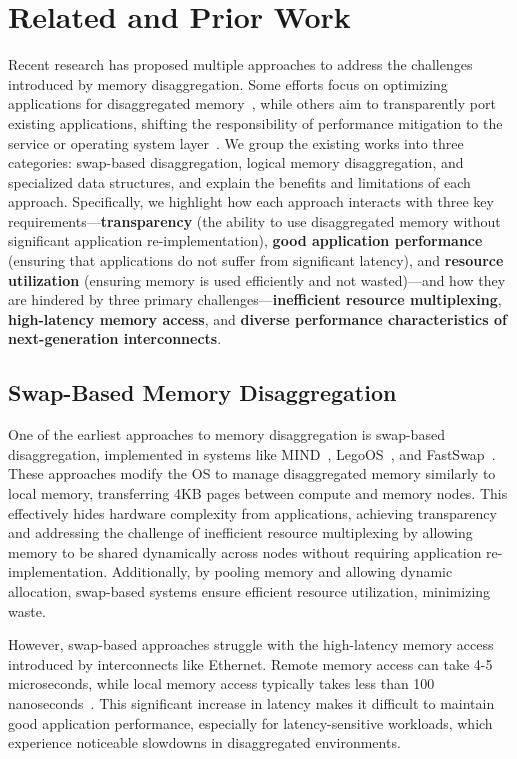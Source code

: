 \chapter{Related and Prior Work}

Recent research has proposed multiple approaches to address the challenges introduced by memory disaggregation. Some efforts focus on optimizing applications for disaggregated memory~\cite{farm, aifm, sherman, existing1}, while others aim to transparently port existing applications, shifting the responsibility of performance mitigation to the service or operating system layer~\cite{mind, legoos, fastswap, infiniswap, runtime1, runtime2}. We group the existing works into three categories: swap-based disaggregation, logical memory disaggregation, and specialized data structures, and explain the benefits and limitations of each approach. Specifically, we highlight how each approach interacts with three key requirements—\textbf{transparency} (the ability to use disaggregated memory without significant application re-implementation), \textbf{good application performance} (ensuring that applications do not suffer from significant latency), and \textbf{resource utilization} (ensuring memory is used efficiently and not wasted)—and how they are hindered by three primary challenges—\textbf{inefficient resource multiplexing}, \textbf{high-latency memory access}, and \textbf{diverse performance characteristics of next-generation interconnects}.

\section{Swap-Based Memory Disaggregation}

One of the earliest approaches to memory disaggregation is swap-based disaggregation, implemented in systems like MIND~\cite{mind}, LegoOS~\cite{legoos}, and FastSwap~\cite{fastswap}. These approaches modify the OS to manage disaggregated memory similarly to local memory, transferring 4KB pages between compute and memory nodes. This effectively hides hardware complexity from applications, achieving transparency and addressing the challenge of inefficient resource multiplexing by allowing memory to be shared dynamically across nodes without requiring application re-implementation. Additionally, by pooling memory and allowing dynamic allocation, swap-based systems ensure efficient resource utilization, minimizing waste.

However, swap-based approaches struggle with the high-latency memory access introduced by interconnects like Ethernet. Remote memory access can take 4-5 microseconds, while local memory access typically takes less than 100 nanoseconds~\cite{cxl1, mind}. This significant increase in latency makes it difficult to maintain good application performance, especially for latency-sensitive workloads, which experience noticeable slowdowns in disaggregated environments.


